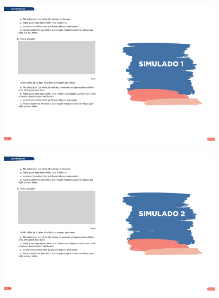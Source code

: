 \begin{figure}[htpb!]
\vspace*{-3cm}
\hspace*{-3cm}\includegraphics[scale=1]{../watermarks/1simulado5ano.pdf}
\end{figure}


\begin{figure}[htpb!]
\vspace*{-3cm}
\hspace*{-2.5cm}\includegraphics[scale=1]{../watermarks/2simulado5ano.pdf}
\end{figure}


